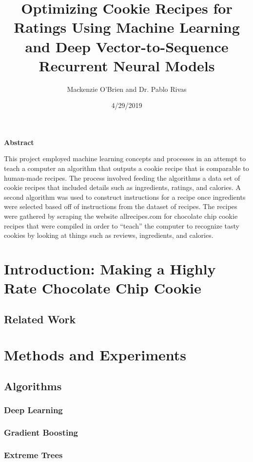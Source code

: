 \documentclass[11pt, a4paper]{article}
\begin{document}
	
	\title{Optimizing Cookie Recipes for Ratings Using Machine Learning and Deep Vector-to-Sequence Recurrent Neural Models}
	\author{Mackenzie O'Brien and Dr. Pablo Rivas}
	\date{4/29/2019}
	\maketitle
	\begin{center}
		\textbf{Abstract}
	\end{center}

	This project employed machine learning concepts and processes in an attempt to teach a computer an algorithm that outputs a cookie recipe that is comparable to human-made recipes.
The process involved feeding the algorithms a data set of cookie recipes that included details such as ingredients, ratings, and calories. A second algorithm was used to construct instructions for a recipe once ingredients were selected based off of instructions from the dataset of recipes.
The recipes were gathered by scraping the website allrecipes.com for chocolate chip cookie recipes that were compiled in order to “teach” the computer to recognize tasty cookies by looking at things such as reviews, ingredients, and calories.
	
	\newpage
	
		\section{ Introduction: Making a Highly Rate Chocolate Chip Cookie}
		\subsection*{Related Work}
		\section{Methods and Experiments}
		\subsection*{Algorithms}
		\subsubsection*{Deep Learning}
		\subsubsection*{Gradient Boosting}
		\subsubsection*{Extreme Trees}
\end{document}
